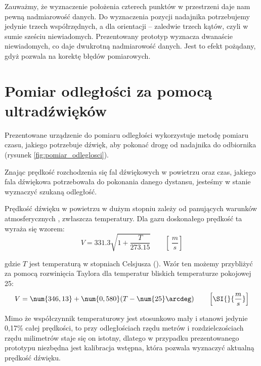 Zauważmy, że wyznaczenie położenia czterech punktów w przestrzeni daje nam pewną nadmiarowość
danych. Do wyznaczenia pozycji nadajnika potrzebujemy jedynie trzech współrzędnych,
a dla orientacji -- zaledwie trzech kątów, czyli w sumie sześciu niewiadomych.
Prezentowany prototyp wyznacza  dwanaście niewiadomych, co daje dwukrotną nadmiarowość danych.
Jest to efekt pożądany, gdyż pozwala na korektę błędów pomiarowych.


\section{Pomiar odległości za pomocą ultradźwięków}

Prezentowane urządzenie do pomiaru odległości wykorzystuje metodę pomiaru czasu, jakiego
potrzebuje dźwięk, aby pokonać drogę od nadajnika do odbiornika
(rysunek \ref{fig:pomiar_odleglosci}).

Znając prędkość rozchodzenia się fal dźwiękowych w powietrzu oraz czas, jakiego fala dźwiękowa potrzebowała
do pokonania danego dystansu, jesteśmy w stanie wyznaczyć szukaną odległość.

Prędkość dźwięku w powietrzu w dużym stopniu zależy od panujących warunków atmosferycznych \cite{bib:soundSpeed},
zwłaszcza temperatury.
Dla gazu doskonałego prędkość ta wyraża się wzorem:
\[
V = \num{331,3}  \sqrt{1+\frac{T}{\num{273,15}}} \qquad \left[ \SI{}{\frac{m}{s}} \right]
\]

gdzie $T$ jest temperaturą w stopniach Celsjusza (\SI{}{\degC}).
Wzór ten możemy przybliżyć za pomocą rozwinięcia Taylora dla temperatur bliskich temperaturze pokojowej \SI{25}{\degC}:
\[
 V = \num{346,13}  +  \num{0,580}(T - \num{25}\arcdeg)  \qquad \left[ \SI{}{ \frac{m}{s}} \right]
\]

Mimo że współczynnik temperaturowy jest stosunkowo mały i stanowi jedynie 0,17\% całej prędkości,
to przy odległościach rzędu metrów i rozdzielczościach rzędu milimetrów staje się on istotny, 
dlatego w przypadku prezentowanego prototypu niezbędna jest kalibracja wstępna, która pozwala
wyznaczyć aktualną prędkość dźwięku.





